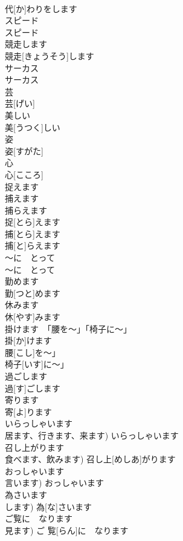 \documentclass[8pt]{extreport}
\begin{document}
\begin{CJK}{UTF8}{min}
\\	代[か]わりをします	
\\	スピード	
\\	スピード	
\\	競走します	
\\	競走[きょうそう]します	
\\	サーカス	
\\	サーカス	
\\	芸	
\\	芸[げい]	
\\	美しい	
\\	美[うつく]しい	
\\	姿	
\\	姿[すがた]	
\\	心	
\\	心[こころ]	
\\	捉えます
\\	捕えます
\\	捕らえます	
\\	捉[とら]えます
\\	捕[とら]えます
\\	捕[と]らえます	
\\	〜に　とって	
\\	〜に　とって	
\\	勤めます	
\\	勤[つと]めます	
\\	休みます	
\\	休[やす]みます	
\\	掛けます　「腰を〜」「椅子に〜」	
\\	掛[か]けます　
\\	腰[こし]を〜」
\\	椅子[いす]に〜」	
\\	過ごします	
\\	過[す]ごします	
\\	寄ります	
\\	寄[よ]ります	
\\	いらっしゃいます	
\\	居ます、行きます、来ます)	いらっしゃいます	
\\	召し上がります	
\\	食べます、飲みます)	召し上[めしあ]がります	
\\	おっしゃいます	
\\	言います)	おっしゃいます	
\\	為さいます	
\\	します)	為[な]さいます	
\\	ご覧に　なります	
\\	見ます)	ご 覧[らん]に　なります	

\end{CJK}
\end{document}
